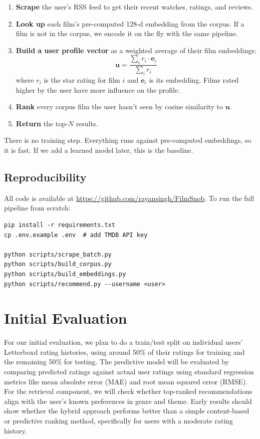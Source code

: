 \documentclass[sigconf,nonacm]{acmart}
\begin{document}
\begin{enumerate}
  \item \textbf{Scrape} the user's RSS feed to get their recent watches, ratings, and reviews.
  \item \textbf{Look up} each film's pre-computed 128-d embedding from the corpus. If a film is not in the corpus, we encode it on the fly with the same pipeline.
  \item \textbf{Build a user profile vector} as a weighted average of their film embeddings:
  \[
    \mathbf{u} = \frac{\sum_{i} r_i \cdot \mathbf{e}_i}{\sum_{i} r_i}
  \]
  where $r_i$ is the star rating for film $i$ and $\mathbf{e}_i$ is its embedding. Films rated higher by the user have more influence on the profile.
  \item \textbf{Rank} every corpus film the user hasn't seen by cosine similarity to $\mathbf{u}$.
  \item \textbf{Return} the top-$N$ results.
\end{enumerate}

There is no training step. Everything runs against pre-computed embeddings, so it is fast. If we add a learned model later, this is the baseline.

\subsection{Reproducibility}

All code is available at \url{https://github.com/rayansingh/FilmSnob}. To run the full pipeline from scratch:

\begin{lstlisting}
pip install -r requirements.txt
cp .env.example .env  # add TMDB API key

python scripts/scrape_batch.py
python scripts/build_corpus.py
python scripts/build_embeddings.py
python scripts/recommend.py --username <user>
\end{lstlisting}

\section{Initial Evaluation}

For our initial evaluation, we plan to do a train/test split on individual users' Letterboxd rating histories, using around 50\% of their ratings for training and the remaining 50\% for testing. The predictive model will be evaluated by comparing predicted ratings against actual user ratings using standard regression metrics like mean absolute error (MAE) and root mean squared error (RMSE). For the retrieval component, we will check whether top-ranked recommendations align with the user's known preferences in genre and theme. Early results should show whether the hybrid approach performs better than a simple content-based or predictive ranking method, specifically for users with a moderate rating history.
\end{document}
